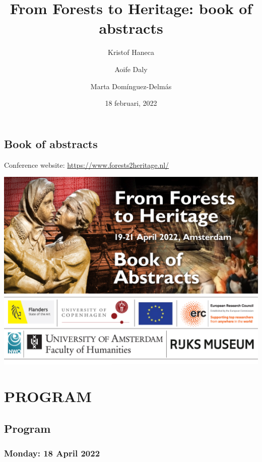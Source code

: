 \documentclass[
]{book}
\title{From Forests to Heritage: book of abstracts}
\author{Kristof Haneca \and Aoife Daly \and Marta Domínguez-Delmás}
\date{18 februari, 2022}
\begin{document}
\maketitle

{
\setcounter{tocdepth}{1}
\tableofcontents
}
\hypertarget{book-of-abstracts}{%
\chapter*{Book of abstracts}\label{book-of-abstracts}}

Conference website: \url{https://www.forests2heritage.nl/}

\href{https://event.forests2heritage.nl/}{\includegraphics[width=1\textwidth,height=\textheight]{bookofAbstracts header.jpg}}

\hypertarget{part-program}{%
\part*{PROGRAM}\label{part-program}}

\hypertarget{program}{%
\chapter*{Program}\label{program}}

\hypertarget{monday-18-april-2022}{%
\section*{Monday: 18 April 2022}\label{monday-18-april-2022}}
\end{document}
